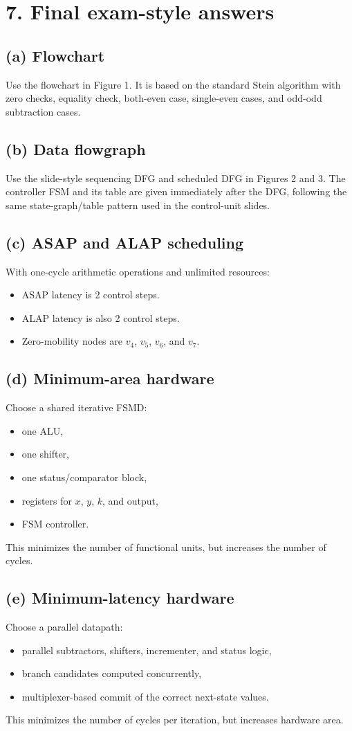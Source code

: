 \documentclass[11pt,a4paper]{article}
\begin{document}
\section*{7. Final exam-style answers}
\subsection*{(a) Flowchart}
Use the flowchart in Figure 1. It is based on the standard Stein algorithm with zero checks, equality check, both-even case, single-even cases, and odd-odd subtraction cases.

\subsection*{(b) Data flowgraph}
Use the slide-style sequencing DFG and scheduled DFG in Figures 2 and 3. The controller FSM and its table are given immediately after the DFG, following the same state-graph/table pattern used in the control-unit slides.

\subsection*{(c) ASAP and ALAP scheduling}
With one-cycle arithmetic operations and unlimited resources:
\begin{itemize}
  \item ASAP latency is 2 control steps.
  \item ALAP latency is also 2 control steps.
  \item Zero-mobility nodes are $v_4$, $v_5$, $v_6$, and $v_7$.
\end{itemize}

\subsection*{(d) Minimum-area hardware}
Choose a shared iterative FSMD:
\begin{itemize}
  \item one ALU,
  \item one shifter,
  \item one status/comparator block,
  \item registers for $x$, $y$, $k$, and output,
  \item FSM controller.
\end{itemize}
This minimizes the number of functional units, but increases the number of cycles.

\subsection*{(e) Minimum-latency hardware}
Choose a parallel datapath:
\begin{itemize}
  \item parallel subtractors, shifters, incrementer, and status logic,
  \item branch candidates computed concurrently,
  \item multiplexer-based commit of the correct next-state values.
\end{itemize}
This minimizes the number of cycles per iteration, but increases hardware area.
\end{document}

